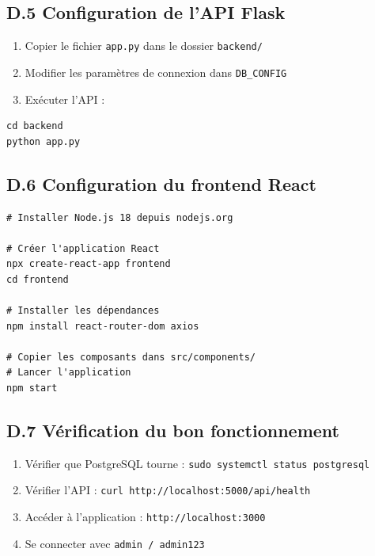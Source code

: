 \subsection*{D.5 Configuration de l'API Flask}

\begin{enumerate}
    \item Copier le fichier \texttt{app.py} dans le dossier \texttt{backend/}
    \item Modifier les paramètres de connexion dans \texttt{DB\_CONFIG}
    \item Exécuter l'API :
\end{enumerate}

\begin{verbatim}
cd backend
python app.py
\end{verbatim}

\subsection*{D.6 Configuration du frontend React}

\begin{verbatim}
# Installer Node.js 18 depuis nodejs.org

# Créer l'application React
npx create-react-app frontend
cd frontend

# Installer les dépendances
npm install react-router-dom axios

# Copier les composants dans src/components/
# Lancer l'application
npm start
\end{verbatim}

\subsection*{D.7 Vérification du bon fonctionnement}

\begin{enumerate}
    \item Vérifier que PostgreSQL tourne : \texttt{sudo systemctl status postgresql}
    \item Vérifier l'API : \texttt{curl http://localhost:5000/api/health}
    \item Accéder à l'application : \texttt{http://localhost:3000}
    \item Se connecter avec \texttt{admin / admin123}
\end{enumerate}

